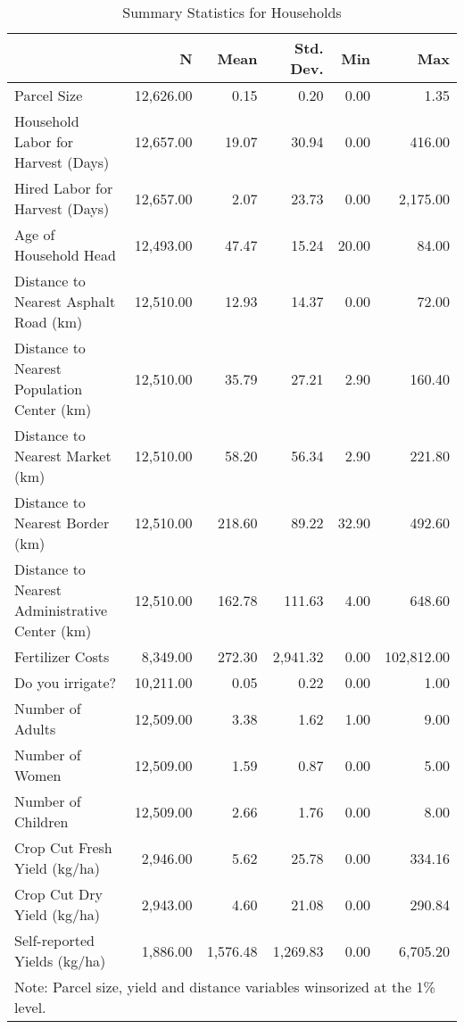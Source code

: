 \begin{table}
\caption{Summary Statistics for Households}
\label{tbl:summary}
\begin{tabular}{lrrrrr}
\toprule
{} & {N} & {Mean} & {Std. Dev.} & {Min} & {Max} \\
\midrule
Parcel Size & 12,626.00 & 0.15 & 0.20 & 0.00 & 1.35 \\
Household Labor for Harvest (Days) & 12,657.00 & 19.07 & 30.94 & 0.00 & 416.00 \\
Hired Labor for Harvest (Days) & 12,657.00 & 2.07 & 23.73 & 0.00 & 2,175.00 \\
Age of Household Head & 12,493.00 & 47.47 & 15.24 & 20.00 & 84.00 \\
Distance to Nearest Asphalt Road (km) & 12,510.00 & 12.93 & 14.37 & 0.00 & 72.00 \\
Distance to Nearest Population Center (km) & 12,510.00 & 35.79 & 27.21 & 2.90 & 160.40 \\
Distance to Nearest Market (km) & 12,510.00 & 58.20 & 56.34 & 2.90 & 221.80 \\
Distance to Nearest Border (km) & 12,510.00 & 218.60 & 89.22 & 32.90 & 492.60 \\
Distance to Nearest Administrative Center (km) & 12,510.00 & 162.78 & 111.63 & 4.00 & 648.60 \\
Fertilizer Costs & 8,349.00 & 272.30 & 2,941.32 & 0.00 & 102,812.00 \\
Do you irrigate? & 10,211.00 & 0.05 & 0.22 & 0.00 & 1.00 \\
Number of Adults & 12,509.00 & 3.38 & 1.62 & 1.00 & 9.00 \\
Number of Women & 12,509.00 & 1.59 & 0.87 & 0.00 & 5.00 \\
Number of Children & 12,509.00 & 2.66 & 1.76 & 0.00 & 8.00 \\
Crop Cut Fresh Yield (kg/ha) & 2,946.00 & 5.62 & 25.78 & 0.00 & 334.16 \\
Crop Cut Dry Yield (kg/ha) & 2,943.00 & 4.60 & 21.08 & 0.00 & 290.84 \\
Self-reported Yields (kg/ha) & 1,886.00 & 1,576.48 & 1,269.83 & 0.00 & 6,705.20 \\
\bottomrule
\multicolumn{6}{l}{Note: Parcel size, yield and distance variables winsorized at the 1\% level.}
\end{tabular}
\end{table}
